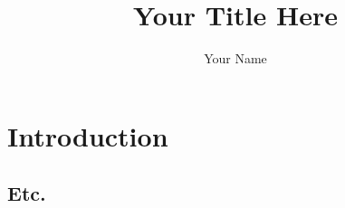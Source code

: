 \documentclass{article}
\title{Your Title Here} \author{Your Name} \date{}
\begin{document}
\maketitle

\section{Introduction}

\subsection{Etc.}
\end{document}
